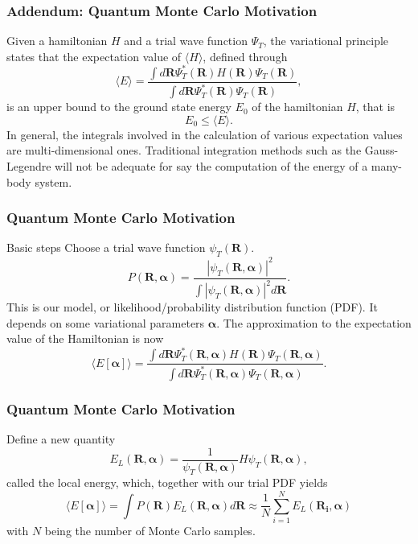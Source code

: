 \documentclass{beamer}
\begin{document}
\begin{frame}
\frametitle{Addendum: Quantum Monte Carlo Motivation}

\begin{block}{}
Given a hamiltonian $H$ and a trial wave function $\Psi_T$, the variational principle states that the expectation value of $\langle H \rangle$, defined through 
\[
   \langle E \rangle =
   \frac{\int d\bm{R}\Psi^{\ast}_T(\bm{R})H(\bm{R})\Psi_T(\bm{R})}
        {\int d\bm{R}\Psi^{\ast}_T(\bm{R})\Psi_T(\bm{R})},
\]
is an upper bound to the ground state energy $E_0$ of the hamiltonian $H$, that is 
\[
    E_0 \le \langle E \rangle.
\]
In general, the integrals involved in the calculation of various  expectation values  are multi-dimensional ones. Traditional integration methods such as the Gauss-Legendre will not be adequate for say the  computation of the energy of a many-body system.
\end{block}
\end{frame}

\begin{frame}
\frametitle{Quantum Monte Carlo Motivation}

\begin{block}{Basic steps }
Choose a trial wave function
$\psi_T(\bm{R})$.
\[
   P(\bm{R},\bm{\alpha})= \frac{\left|\psi_T(\bm{R},\bm{\alpha})\right|^2}{\int \left|\psi_T(\bm{R},\bm{\alpha})\right|^2d\bm{R}}.
\]
This is our model, or likelihood/probability distribution function  (PDF). It depends on some variational parameters $\bm{\alpha}$.
The approximation to the expectation value of the Hamiltonian is now 
\[
   \langle E[\bm{\alpha}] \rangle = 
   \frac{\int d\bm{R}\Psi^{\ast}_T(\bm{R},\bm{\alpha})H(\bm{R})\Psi_T(\bm{R},\bm{\alpha})}
        {\int d\bm{R}\Psi^{\ast}_T(\bm{R},\bm{\alpha})\Psi_T(\bm{R},\bm{\alpha})}.
\]
\end{block}
\end{frame}

\begin{frame}
\frametitle{Quantum Monte Carlo Motivation}

\begin{block}{Define a new quantity }
\[
   E_L(\bm{R},\bm{\alpha})=\frac{1}{\psi_T(\bm{R},\bm{\alpha})}H\psi_T(\bm{R},\bm{\alpha}),
\]
called the local energy, which, together with our trial PDF yields
\[
  \langle E[\bm{\alpha}] \rangle=\int P(\bm{R})E_L(\bm{R},\bm{\alpha}) d\bm{R}\approx \frac{1}{N}\sum_{i=1}^NE_L(\bm{R_i},\bm{\alpha})
\]
with $N$ being the number of Monte Carlo samples.
\end{block}
\end{frame}
\end{document}
